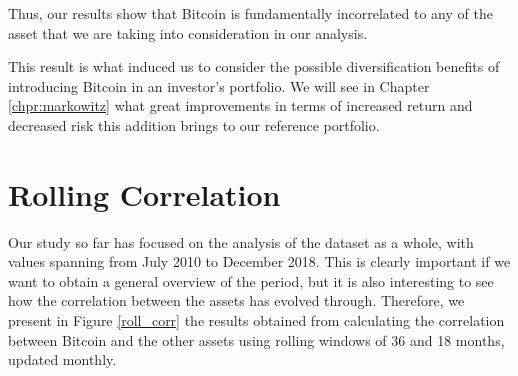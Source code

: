 Thus, our results show that Bitcoin is fundamentally incorrelated to any of the asset that we are taking into consideration in our analysis.

This result is what induced us to consider the possible diversification benefits of introducing  Bitcoin in an investor's portfolio. 
We will see in Chapter \ref{chpr:markowitz} what great improvements in terms of increased return and  decreased risk this addition brings to our reference portfolio. 





 \bigskip
\section{Rolling Correlation}
Our study so far has focused on the analysis of the dataset as a whole, with values spanning from  July 2010 to December 2018. This is clearly  important if we want to obtain a general overview of the period, but it is also interesting to see how the correlation between the  assets has evolved through. 
Therefore, we present in Figure \ref{roll_corr} the results obtained from calculating the correlation between Bitcoin and the other assets using  rolling windows of 36 and 18 months, updated monthly.


